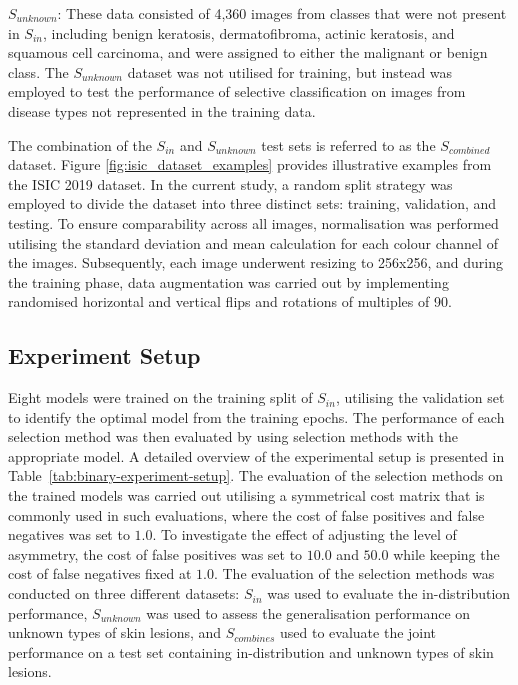 $S_{unknown}$: These data consisted of 4,360 images from classes that were not present in $S_{in}$, including benign keratosis, dermatofibroma, actinic keratosis, and squamous cell carcinoma, and were assigned to either the malignant or benign class. The $S_{unknown}$ dataset was not utilised for training, but instead was employed to test the performance of selective classification on images from disease types not represented in the training data.

The combination of the $S_{in}$ and $S_{unknown}$ test sets is referred to as the $S_{combined}$ dataset. Figure \ref{fig:isic_dataset_examples} provides illustrative examples from the ISIC 2019 dataset. In the current study, a random split strategy was employed to divide the dataset into three distinct sets: training, validation, and testing. To ensure comparability across all images, normalisation was performed utilising the standard deviation and mean calculation for each colour channel of the images. Subsequently, each image underwent resizing to 256x256, and during the training phase, data augmentation was carried out by implementing randomised horizontal and vertical flips and rotations of multiples of 90\textdegree.

\subsection{Experiment Setup}
Eight models were trained on the training split of $S_{in}$, utilising the validation set to identify the optimal model from the training epochs. The performance of each selection method was then evaluated by using selection methods with the appropriate model. A detailed overview of the experimental setup is presented in Table~\ref{tab:binary-experiment-setup}. The evaluation of the selection methods on the trained models was carried out utilising a symmetrical cost matrix that is commonly used in such evaluations, where the cost of false positives and false negatives was set to $1.0$. To investigate the effect of adjusting the level of asymmetry, the cost of false positives was set to $10.0$ and $50.0$ while keeping the cost of false negatives fixed at $1.0$. The evaluation of the selection methods was conducted on three different datasets: $S_{in}$ was used to evaluate the in-distribution performance, $S_{unknown}$ was used to assess the generalisation performance on unknown types of skin lesions, and $S_{combines}$ used to evaluate the joint performance on a test set containing in-distribution and unknown types of skin lesions.

